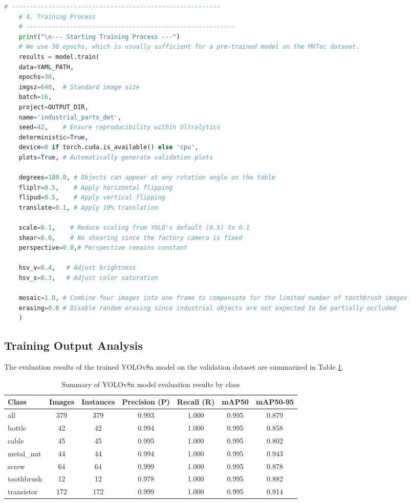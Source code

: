 \documentclass{article}
\begin{document}
	\begin{lstlisting}[language=Python, caption={Implementing the YOLOv8n model training}]
	# ---------------------------------------------------------
	# 4. Training Process
	# ---------------------------------------------------------
	print("\n--- Starting Training Process ---")
	# We use 30 epochs, which is usually sufficient for a pre-trained model on the MVTec dataset.
	results = model.train(
	data=YAML_PATH,
	epochs=30,
	imgsz=640,  # Standard image size
	batch=16, 
	project=OUTPUT_DIR,
	name='industrial_parts_det',
	seed=42,    # Ensure reproducibility within Ultralytics
	deterministic=True,
	device=0 if torch.cuda.is_available() else 'cpu',
	plots=True, # Automatically generate validation plots
	
	degrees=180.0, # Objects can appear at any rotation angle on the table
	fliplr=0.5,    # Apply horizontal flipping
	flipud=0.5,    # Apply vertical flipping
	translate=0.1, # Apply 10% translation
	
	scale=0.1,    # Reduce scaling from YOLO's default (0.5) to 0.1 
	shear=0.0,    # No shearing since the factory camera is fixed
	perspective=0.0,# Perspective remains constant
	
	hsv_v=0.4,   # Adjust brightness
	hsv_s=0.3,   # Adjust color saturation
	
	mosaic=1.0, # Combine four images into one frame to compensate for the limited number of toothbrush images
	erasing=0.0 # Disable random erasing since industrial objects are not expected to be partially occluded
	)
	\end{lstlisting}

\subsection{Training Output Analysis}

The evaluation results of the trained YOLOv8n model on the validation dataset are summarized in Table \ref{tab:training_results}.

\begin{table}[htbp]
	\centering
	\caption{Summary of YOLOv8n model evaluation results by class}
	\label{tab:training_results}
		
		\begin{tabular}{lcccccc}
			\hline
			Class & Images & Instances & Precision (P) & Recall (R) & mAP50 & mAP50-95 \\
			\hline
			all & 379 & 379 & 0.993 & 1.000 & 0.995 & 0.879 \\
			bottle & 42 & 42 & 0.994 & 1.000 & 0.995 & 0.858 \\
			cable & 45 & 45 & 0.995 & 1.000 & 0.995 & 0.802 \\
			metal\_nut & 44 & 44 & 0.994 & 1.000 & 0.995 & 0.943 \\
			screw & 64 & 64 & 0.999 & 1.000 & 0.995 & 0.878 \\
			toothbrush & 12 & 12 & 0.978 & 1.000 & 0.995 & 0.882 \\
			transistor & 172 & 172 & 0.999 & 1.000 & 0.995 & 0.914 \\
			\hline
		\end{tabular}
\end{table}
\end{document}
